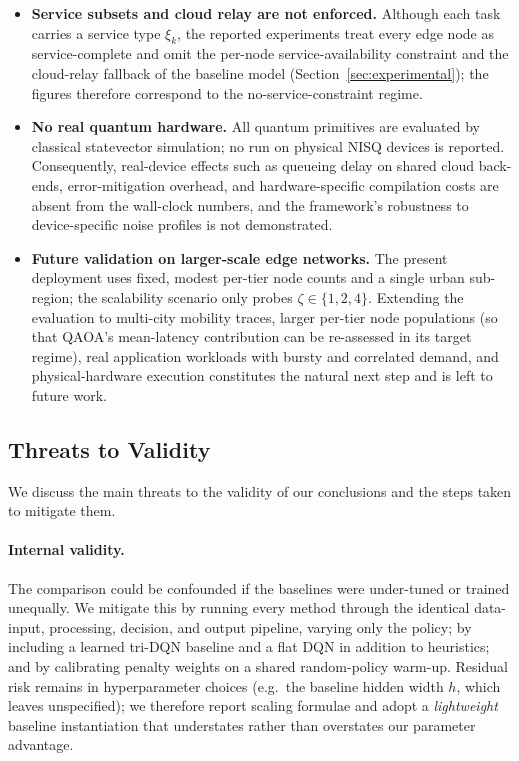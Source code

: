 \documentclass[11pt,a4paper]{article}
\theoremstyle{definition}
\begin{document}
\begin{itemize}
\item \textbf{Service subsets and cloud relay are not enforced.} Although each task carries a service type $\xi_k$, the reported experiments treat every edge node as service-complete and omit the per-node service-availability constraint and the cloud-relay fallback of the baseline model (Section~\ref{sec:experimental}); the figures therefore correspond to the no-service-constraint regime.

\item \textbf{No real quantum hardware.} All quantum primitives are evaluated by classical statevector simulation; no run on physical NISQ devices is reported. Consequently, real-device effects such as queueing delay on shared cloud back-ends, error-mitigation overhead, and hardware-specific compilation costs are absent from the wall-clock numbers, and the framework's robustness to device-specific noise profiles is not demonstrated.

\item \textbf{Future validation on larger-scale edge networks.} The present deployment uses fixed, modest per-tier node counts and a single urban sub-region; the scalability scenario only probes $\zeta\!\in\!\{1,2,4\}$. Extending the evaluation to multi-city mobility traces, larger per-tier node populations (so that QAOA's mean-latency contribution can be re-assessed in its target regime), real application workloads with bursty and correlated demand, and physical-hardware execution constitutes the natural next step and is left to future work.
\end{itemize}

\subsection{Threats to Validity}
\label{subsec:threats}

We discuss the main threats to the validity of our conclusions and the steps taken to mitigate them.

\paragraph{Internal validity.}
The comparison could be confounded if the baselines were under-tuned or trained unequally. We mitigate this by running every method through the identical data-input, processing, decision, and output pipeline, varying only the policy; by including a learned tri-DQN baseline and a flat DQN in addition to heuristics; and by calibrating penalty weights on a shared random-policy warm-up. Residual risk remains in hyperparameter choices (e.g.\ the baseline hidden width $h$, which~\cite{hrl_ntn} leaves unspecified); we therefore report scaling formulae and adopt a \emph{lightweight} baseline instantiation that understates rather than overstates our parameter advantage.
\end{document}
